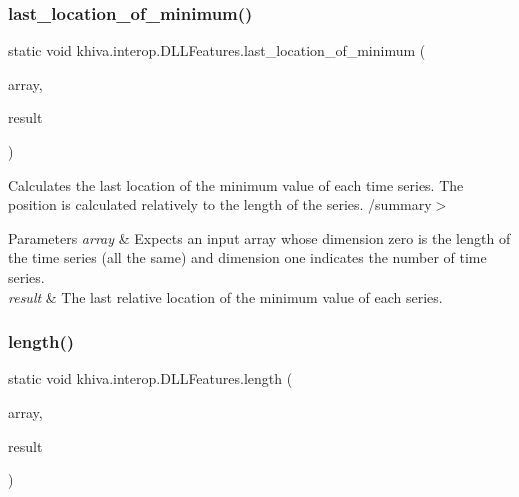 \mbox{\label{classkhiva_1_1interop_1_1_d_l_l_features_af801e4d6b8fed411a5a8bf0a3f32a631}} 
\subsubsection{\texorpdfstring{last\+\_\+location\+\_\+of\+\_\+minimum()}{last\_location\_of\_minimum()}}
{\footnotesize\ttfamily static void khiva.\+interop.\+D\+L\+L\+Features.\+last\+\_\+location\+\_\+of\+\_\+minimum (\begin{DoxyParamCaption}\item[{\mbox{[}\+In\mbox{]} ref Int\+Ptr}]{array,  }\item[{\mbox{[}\+Out\mbox{]} out Int\+Ptr}]{result }\end{DoxyParamCaption})\hspace{0.3cm}{\ttfamily [static]}}



Calculates the last location of the minimum value of each time series. The position is calculated relatively to the length of the series. /summary$>$ 
\begin{DoxyParams}{Parameters}
{\em array} & Expects an input array whose dimension zero is the length of the time series (all the same) and dimension one indicates the number of time series.\\
\hline
{\em result} & The last relative location of the minimum value of each series.\\
\hline
\end{DoxyParams}


\mbox{\label{classkhiva_1_1interop_1_1_d_l_l_features_a106f996c2c7cded64905d3dd25ed023a}} 
\subsubsection{\texorpdfstring{length()}{length()}}
{\footnotesize\ttfamily static void khiva.\+interop.\+D\+L\+L\+Features.\+length (\begin{DoxyParamCaption}\item[{\mbox{[}\+In\mbox{]} ref Int\+Ptr}]{array,  }\item[{\mbox{[}\+Out\mbox{]} out Int\+Ptr}]{result }\end{DoxyParamCaption})\hspace{0.3cm}{\ttfamily [static]}}



